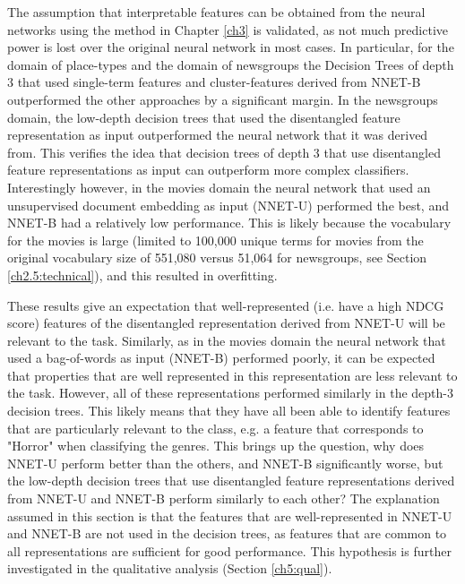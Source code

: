 The assumption that interpretable features can be obtained from the neural networks using the method in Chapter \ref{ch3} is validated, as not much predictive power is lost over the original neural network in most cases. In particular, for the domain of place-types and the domain of newsgroups the Decision Trees of depth 3 that used  single-term features and cluster-features derived from NNET-B outperformed the other approaches by a significant margin. In the newsgroups domain, the low-depth decision trees that used the disentangled feature representation as input outperformed the neural network that  it was derived from. This verifies  the idea that decision trees of depth 3 that use disentangled feature representations as input can outperform more complex classifiers. Interestingly however, in the  movies domain the neural network that used an unsupervised document embedding as input (NNET-U) performed the best, and NNET-B had a relatively low performance.  This is likely because the vocabulary for the movies is large (limited to 100,000 unique terms for movies from the original vocabulary size of 551,080 versus 51,064 for newsgroups, see Section \ref{ch2.5:technical}), and this resulted in overfitting. 

These results give an  expectation that well-represented (i.e. have a high NDCG score) features of the disentangled representation derived from NNET-U  will be relevant to the task. Similarly, as in the movies domain the neural network that used a  bag-of-words as input (NNET-B) performed poorly, it can be expected that properties that are well represented in this representation are less relevant to the task. However, all of these representations performed similarly in the depth-3 decision trees. This likely means that they  have all been able to identify  features that are particularly relevant to the class, e.g. a feature that corresponds to "Horror" when classifying the genres. This brings up the question, why does NNET-U perform better than the others, and NNET-B significantly worse, but the low-depth decision trees that use disentangled feature representations derived from NNET-U and NNET-B perform similarly to each other? The explanation assumed in this section is that the features that are well-represented in NNET-U and NNET-B are not used in the decision trees, as features that are common to all representations are sufficient for good performance. This hypothesis is further investigated in the qualitative analysis (Section \ref{ch5:qual}).



